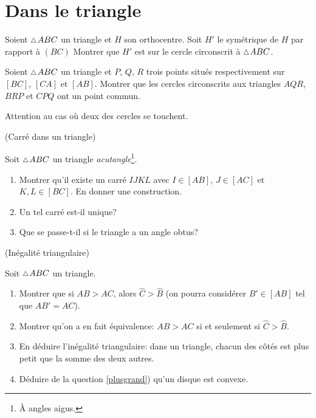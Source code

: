 \documentclass[a4paper,11pt,reqno]{amsart}
\begin{document}
\section{Dans le triangle}

\begin{exo}[.49]

  Soient $\tri ABC$ un triangle et $H$  son orthocentre. Soit $H'$ le symétrique de $H$ par rapport à $(BC)$ Montrer que $H'$ est sur le cercle circonscrit à $\tri ABC$.
\end{exo}

\begin{exo}[.7]

  Soient $\tri ABC$ un triangle et $P$, $Q$, $R$ trois points situés respectivement sur $[BC]$, $[CA]$ et $[AB]$. Montrer que les cercles circonscrits aux triangles $AQR$, $BRP$ et $CPQ$ ont un point commun.\\
  \begin{indication}
    Attention au cas où deux des cercles se touchent.
  \end{indication}
\end{exo}


\begin{exo} (Carré dans un  triangle)

  Soit $\tri ABC$ un triangle \emph{acutangle}\footnote{À angles aigus.}.
  \begin{enumerate}
    \item Montrer qu'il existe un carré $IJKL$ avec $I \in [AB]$, $J \in [AC]$ et $K,L \in [BC]$. En donner une construction.
    \item Un tel carré est-il unique?
    \item Que se passe-t-il si le triangle a un angle obtus?
  \end{enumerate}
\end{exo}

\begin{exo} (Inégalité triangulaire)

  Soit $\tri ABC$ un triangle.
  \begin{enumerate}
    \item \label{plusgrand} Montrer que si $AB > AC$, alors $\widehat{C}>\widehat{B}$ (on pourra considérer $B' \in [AB]$ tel que $AB'=AC$). %
    \item Montrer qu'on a en fait équivalence: $AB>AC$ si et seulement si $\widehat{C}>\widehat{B}$.
    \item En déduire l'inégalité triangulaire: dans un triangle, chacun des côtés est plus petit que la somme des deux autres.
    \item Déduire de la question \ref{plusgrand}) qu'un disque est convexe.
  \end{enumerate}
\end{exo}
\end{document}
